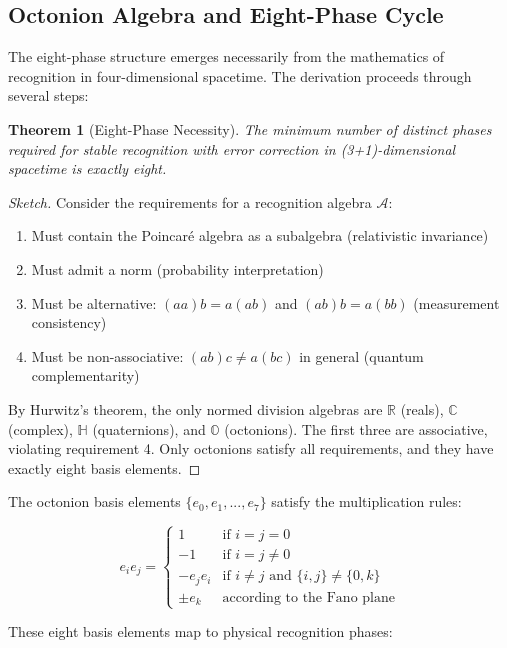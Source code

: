 \documentclass[12pt,a4paper]{article}
\newtheorem{theorem}{Theorem}
\newcommand{\R}{\mathbb{R}}
\newcommand{\C}{\mathbb{C}}
\begin{document}
\subsection{Octonion Algebra and Eight-Phase Cycle}

The eight-phase structure emerges necessarily from the mathematics of recognition in four-dimensional spacetime. The derivation proceeds through several steps:

\begin{theorem}[Eight-Phase Necessity]
The minimum number of distinct phases required for stable recognition with error correction in (3+1)-dimensional spacetime is exactly eight.
\end{theorem}

\begin{proof}[Sketch]
Consider the requirements for a recognition algebra $\mathcal{A}$:
\begin{enumerate}
\item Must contain the Poincaré algebra as a subalgebra (relativistic invariance)
\item Must admit a norm (probability interpretation)
\item Must be alternative: $(aa)b = a(ab)$ and $(ab)b = a(bb)$ (measurement consistency)
\item Must be non-associative: $(ab)c \neq a(bc)$ in general (quantum complementarity)
\end{enumerate}

By Hurwitz's theorem, the only normed division algebras are $\R$ (reals), $\C$ (complex), $\mathbb{H}$ (quaternions), and $\mathbb{O}$ (octonions). The first three are associative, violating requirement 4. Only octonions satisfy all requirements, and they have exactly eight basis elements.
\end{proof}

The octonion basis elements $\{e_0, e_1, ..., e_7\}$ satisfy the multiplication rules:

\begin{equation}
e_i e_j = \begin{cases}
1 & \text{if } i = j = 0 \\
-1 & \text{if } i = j \neq 0 \\
-e_j e_i & \text{if } i \neq j \text{ and } \{i,j\} \neq \{0,k\} \\
\pm e_k & \text{according to the Fano plane}
\end{cases}
\end{equation}

These eight basis elements map to physical recognition phases:
\end{document}

